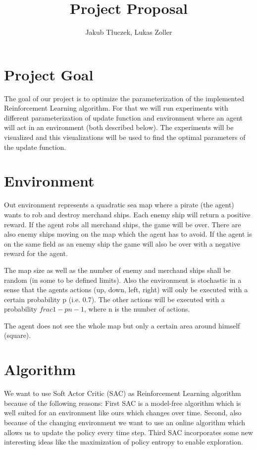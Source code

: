 \documentclass[11pt]{article} %
\title{Project Proposal}
\author{Jakub Tłuczek, Lukas Zoller}
\begin{document}
\maketitle

\section{Project Goal}
The goal of our project is to optimize the parameterization of the implemented Reinforcement Learning algorithm. For that we will run experiments with different parameterization of update function and environment where an agent will act in an environment (both described below). The experiments will be visualized and this visualizations will be used to find the optimal parameters of the update function.

\section{Environment}
Out environment represents a quadratic sea map where a pirate (the agent) wants to rob and destroy merchand ships. Each enemy ship will return a positive reward. If the agent robs all merchand ships, the game will be over. There are also enemy ships moving on the map which the agent has to avoid. If the agent is on the same field as an enemy ship the game will also be over with a negative reward for the agent.

The map size as well as the number of enemy and merchand ships shall be random (in some to be defined limits). Also the environment is stochastic in a sense that the agents actions (up, down, left, right) will only be executed with a certain probability p (i.e. 0.7). The other actions will be executed with a probability $frac{1-p}{n-1}$, where n is the number of actions. 

The agent does not see the whole map but only a certain area around himself (square). 

\section{Algorithm}
We want to use Soft Actor Critic (SAC) as Reinforcement Learning algorithm because of the following reasons: First SAC is a model-free algorithm which is well suited for an environment like ours which changes over time. Second, also because of the changing environment we want to use an online algorithm which allows us to update the policy every time step. Third SAC incorporates some new interesting ideas like the maximization of policy entropy to enable exploration.
\end{document}
